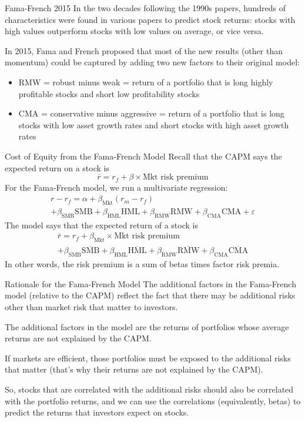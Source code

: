\documentclass[xcolor=dvipsnames,10pt]{beamer}
\begin{document}
\begin{frame}{Fama-French 2015}
In the two decades following the 1990s papers, hundreds of characteristics were found in various papers to predict stock returns: stocks with high values outperform stocks with low values on average, or vice versa.

In 2015, Fama and French proposed that most of the new results (other than momentum) could be captured by adding two new factors to their original model:
\begin{itemize}
    \item RMW = robust minus weak = return of a portfolio that is long highly profitable stocks and short low profitability stocks
    \item CMA = conservative minus aggressive = return of a portfolio that is long stocks with low asset growth rates and short stocks with high asset growth rates
\end{itemize}
\end{frame}

\begin{frame}{Cost of Equity from the Fama-French Model}
    Recall that the CAPM says the expected return on a stock is
    $$\bar{r} = r_f + \beta \times \text{Mkt risk premium}$$
        For the Fama-French model, we run a multivariate regression:
   \begin{multline*}
   r-r_f = \alpha + \beta_{\text{Mkt}}(r_m-r_f) \\+ \beta_{\text{SMB}}\text{SMB}
    + \beta_{\text{HML}}\text{HML}
    + \beta_{\text{RMW}}\text{RMW}
    + \beta_{\text{CMA}}\text{CMA} + \varepsilon
    \end{multline*}
    The model says that the expected return of a stock is
    \begin{multline*}\bar{r} = r_f + \beta_{\text{Mkt}} \times \text{Mkt risk premium} \\+ \beta_{\text{SMB}}\overline{\text{SMB}}
    + \beta_{\text{HML}}\overline{\text{HML}}
    + \beta_{\text{RMW}}\overline{\text{RMW}}
    + \beta_{\text{CMA}}\overline{\text{CMA}}
    \end{multline*}
    In other words, the risk premium is a sum of betas times factor risk premia.  
\end{frame}

\begin{frame}{Rationale for the Fama-French Model}
   The additional factors in the Fama-French model (relative to the CAPM) reflect the fact that there may be additional risks other than market risk that matter to investors.  
   
   The additional factors in the model are the returns of portfolios whose average returns are not explained by the CAPM.
   
   If markets are efficient, those portfolios must be exposed to the additional risks that matter (that's why their returns are not explained by the CAPM).
   
   So, stocks that are correlated with the additional risks should also be correlated with the portfolio returns, and we can use the correlations (equivalently, betas) to predict the returns that investors expect on stocks.
\end{frame}
\end{document}

